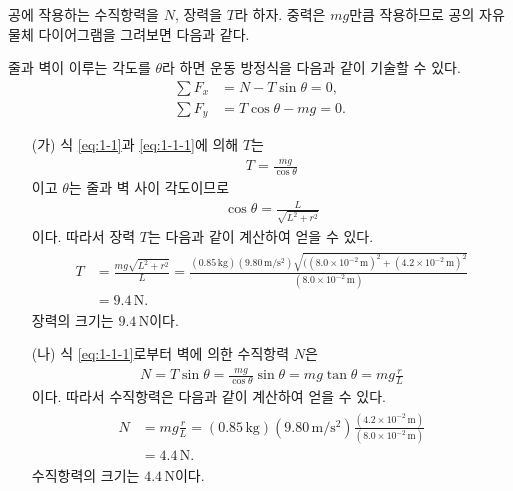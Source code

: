 \documentclass[floatfix,nofootinbib,superscriptaddress,fleqn]{revtex4-2}
\begin{document}
공에 작용하는 수직항력을 $N$, 장력을 $T$라 하자. 중력은 $mg$만큼 
작용하므로 공의 자유 물체 다이어그램을 그려보면 다음과 같다.
\begin{figure}[htbp]
  \centering
\end{figure} 

줄과 벽이 이루는 각도를 $\theta$라 하면
운동 방정식을 다음과 같이 기술할 수 있다.
\begin{align}
  \label{eq:1-1}\sum F_x &= N-T\sin\theta =0, \\
  \label{eq:1-1-1}\sum F_y &= T\cos\theta -mg =0.
\end{align}

\begin{itemize}
  \item[(가)] 식 \eqref{eq:1-1}과 \eqref{eq:1-1-1}에 의해 $T$는
  \begin{align}
    T = \frac{mg}{\cos\theta}
  \end{align}
  이고 $\theta$는 줄과 벽 사이 각도이므로
  \begin{align}
    \cos\theta = \frac{L}{\sqrt{L^2+r^2}}
  \end{align}
  이다. 따라서 장력 $T$는 다음과 같이 계산하여 얻을 수 있다.
  \begin{align}
    \begin{split}
      T &=\frac{mg\sqrt{L^2+r^2}}{L}
      = \frac{(0.85\,\mathrm{kg})(9.80\,\mathrm{m/s^2})
      \sqrt{((8.0\times 10^{-2}\,\mathrm{m})^2
      +(4.2\times 10^{-2}\,\mathrm{m})^2}}
      {(8.0\times 10^{-2}\,\mathrm{m})} \\
      &= 9.4\,\mathrm{N}.
    \end{split}
  \end{align}
  장력의 크기는 $9.4\,\mathrm{N}$이다.
  \item[(나)]
  식 \eqref{eq:1-1-1}로부터 벽에 의한 수직항력 $N$은
  \begin{align}
    N =T\sin\theta =\frac{mg}{\cos\theta}\sin\theta=mg\tan\theta
    =mg\frac{r}{L} 
  \end{align}
  이다. 따라서 수직항력은 다음과 같이 계산하여 얻을 수 있다.
  \begin{align}
    \begin{split}
      N &=mg\frac{r}{L} 
      = (0.85\,\mathrm{kg})(9.80\,\mathrm{m/s^2})
      \frac{(4.2\times 10^{-2}\,\mathrm{m})}
      {(8.0\times 10^{-2}\,\mathrm{m})} \\
      &= 4.4\,\mathrm{N}.
    \end{split}
  \end{align}
  수직항력의 크기는 $4.4\,\mathrm{N}$이다.
\end{itemize}
\end{document}
